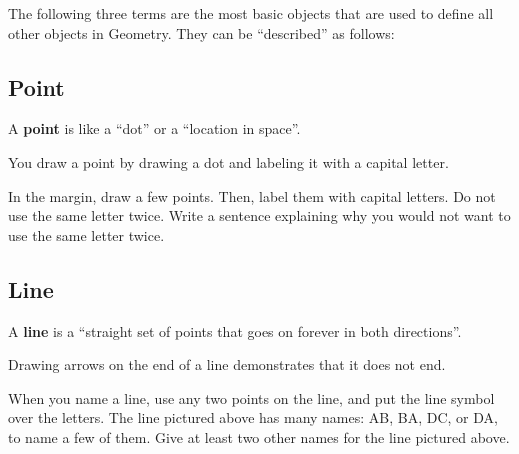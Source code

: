 The following three terms are the most basic objects that are used to define all other objects in Geometry.  They can be ``described'' as follows:

\subsection{Point}

A \textbf{point} is like a ``dot'' or a ``location in space''. \\

\newpage

You draw a point by drawing a dot and labeling it with a capital letter. 

	\begin{center}
	\end{center}

\noindent \q In the margin, draw a few points. Then, label them with capital letters.
Do not use the same letter twice. \aq Write a sentence explaining why you would not want to use the same letter twice.

\subsection{Line}

A \textbf{line} is a ``straight set of points that goes on forever in both directions''. 

Drawing arrows on the end of a line demonstrates that it does not end. 

	\begin{center}
	\end{center}	

When you name a line, use any two points on the line, 
and put the line symbol over the letters. 
The line pictured above has many names: \lin AB, \lin BA, 
\lin DC, or \lin DA, to name a few of them. \q Give at least two other names for the line pictured above.

